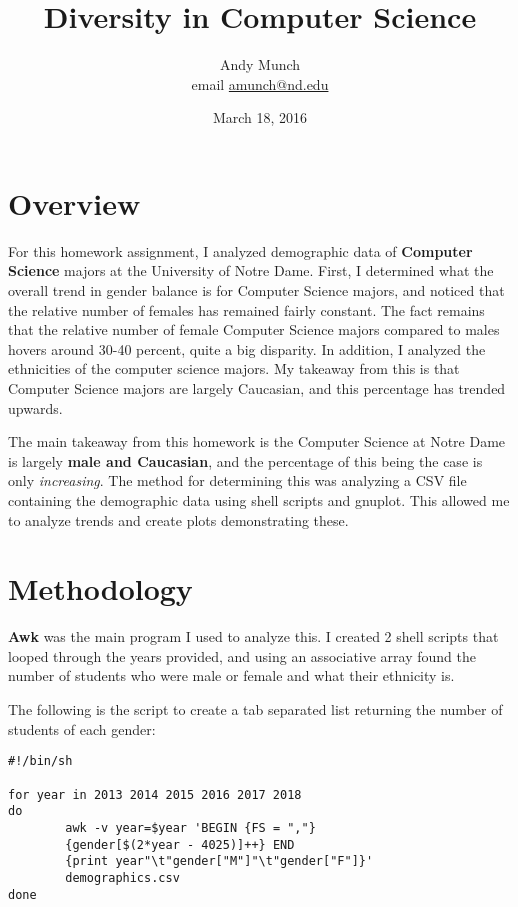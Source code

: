 \documentclass{article}
\title{Diversity in Computer Science}
\author{Andy Munch \\ email \href{mailto:amunch@nd.edu}{amunch@nd.edu}}
\date{March 18, 2016}
\begin{document}
\maketitle

\section{Overview}

For this homework assignment, I analyzed demographic data of \textbf{Computer Science} majors at the University of Notre Dame.  First, I determined what the overall trend in gender balance is for Computer Science majors, and noticed that the relative number of females has remained fairly constant.  The fact remains that the relative number of female Computer Science majors compared to males hovers around 30-40 percent, quite a big disparity.  In addition, I analyzed the ethnicities of the computer science majors.  My takeaway from this is that Computer Science majors are largely Caucasian, and this percentage has trended upwards.

The main takeaway from this homework is the Computer Science at Notre Dame is largely \textbf{male and Caucasian}, and the percentage of this being the case is only \textit{increasing}.  The method for determining this was analyzing a CSV file containing the demographic data using shell scripts and gnuplot.  This allowed me to analyze trends and create plots demonstrating these.

\section{Methodology}

\textbf{Awk} was the main program I used to analyze this.  I created 2 shell scripts that looped through the years provided, and using an associative array found the number of students who were male or female and what their ethnicity is.  

The following is the script to create a tab separated list returning the number of students of each gender:

\begin{verbatim}
#!/bin/sh

for year in 2013 2014 2015 2016 2017 2018
do
        awk -v year=$year 'BEGIN {FS = ","} 
        {gender[$(2*year - 4025)]++} END 
        {print year"\t"gender["M"]"\t"gender["F"]}' 
        demographics.csv
done
\end{verbatim}
\end{document}
